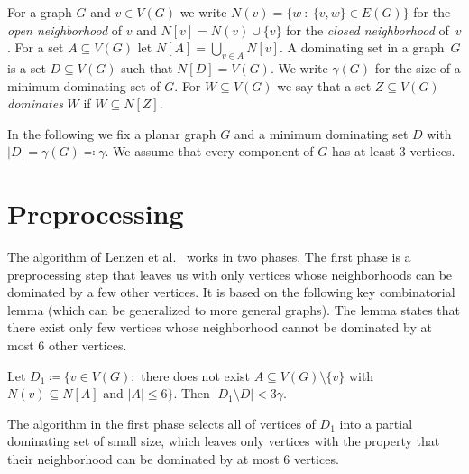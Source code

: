 \documentclass[a4paper,UKenglish,cleveref, autoref, thm-restate]{lipics-v2021}
\begin{document}
For a graph $G$ and $v\in V(G)$ we write $N(v)=\{w~:~\{v,w\}\in E(G)\}$
for the \emph{open neighborhood} of $v$ and $N[v]=N(v)\cup\{v\}$ for
the \emph{closed neighborhood} of~$v$. For a set $A\subseteq V(G)$ let
$N[A]=\bigcup_{v\in A}N[v]$.
A dominating set in a graph~$G$ is a set
$D\subseteq V(G)$ such that $N[D]=V(G)$. We write $\gamma(G)$ for
the size of a minimum dominating set of $G$. For $W\subseteq V(G)$
we say that a set $Z\subseteq V(G)$ \emph{dominates}
 $W$ if $W\subseteq N[Z]$.

 \begin{tcolorbox}
In the following we fix a planar graph $G$ and a minimum dominating
set $D$ with $|D|=\gamma(G)\eqqcolon \gamma$. We assume
that every component
of $G$ has at least $3$ vertices.
\end{tcolorbox}

\section{Preprocessing}

The algorithm of Lenzen et al.~\cite{lenzen2013distributed} works in two
phases. The first phase is a preprocessing step that leaves us with
only vertices whose neighborhoods can be dominated by a few other
vertices. It is based on the following key combinatorial lemma (which
can be generalized to more general graphs). The lemma states
that there exist only few vertices whose neighborhood cannot be
dominated by at most $6$ other vertices.

\begin{lemma}\label{lem:lenzen}
Let $D_1\coloneqq \{v\in V(G) : $ there does not
exist $A\subseteq V(G)\setminus \{v\}$ with $N(v)\subseteq N[A]$
and $|A|\leq 6\}$. Then $|D_1\setminus D|< 3\gamma$.
\end{lemma}

The algorithm in the first phase selects all of vertices of $D_1$ into
a partial dominating set of small size, which leaves only
vertices with the property that their neighborhood can be dominated
by at most $6$ vertices. 
\end{document}
